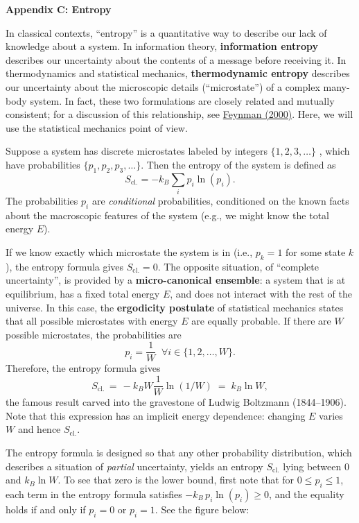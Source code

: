 \documentclass[pra,12pt]{revtex4}
\begin{document}
\begin{center}
{\large \textbf{Appendix C: Entropy}}
\end{center}

In classical contexts, ``entropy'' is a quantitative way to describe
our lack of knowledge about a system.  In information theory,
\textbf{information entropy} describes our uncertainty about the
contents of a message before receiving it.  In thermodynamics and
statistical mechanics, \textbf{thermodynamic entropy} describes our
uncertainty about the microscopic details (``microstate'') of a
complex many-body system.  In fact, these two formulations are closely
related and mutually consistent; for a discussion of this
relationship, see \hyperref[cite:feynman]{Feynman (2000)}.  Here, we
will use the statistical mechanics point of view.

Suppose a system has discrete microstates labeled by integers
$\{1,2,3,\dots\}$ , which have probabilities $\{p_1, p_2, p_3,
\dots\}$.  Then the entropy of the system is defined as
$$S_{\mathrm{cl.}} = - k_B \sum_{i} p_i \ln(p_i).$$
The probabilities $p_i$ are \textit{conditional} probabilities,
conditioned on the known facts about the macroscopic features of the
system (e.g., we might know the total energy $E$).

If we know exactly which microstate the system is in (i.e., $p_k = 1$
for some state $k$), the entropy formula gives $S _{\mathrm{cl.}} =
0$.  The opposite situation, of ``complete uncertainty'', is provided
by a \textbf{micro-canonical ensemble}: a system that is at
equilibrium, has a fixed total energy $E$, and does not interact with
the rest of the universe.  In this case, the \textbf{ergodicity
  postulate} of statistical mechanics states that all possible
microstates with energy $E$ are equally probable.  If there are $W$
possible microstates, the probabilities are
$$p_i = \frac{1}{W} \;\;\forall i \in \{1,2,\dots,W\}.$$
Therefore, the entropy formula gives
$$S_{\mathrm{cl.}} \,=\, -k_B W \frac{1}{W} \ln(1/W) \;=\; k_B \ln W,$$
the famous result carved into the gravestone of Ludwig Boltzmann
(1844--1906).  Note that this expression has an implicit energy
dependence: changing $E$ varies $W$ and hence $S_{\mathrm{cl.}}$.

The entropy formula is designed so that any other probability
distribution, which describes a situation of \textit{partial}
uncertainty, yields an entropy $S_{\mathrm{cl.}}$ lying between $0$
and $k_B \ln W$.  To see that zero is the lower bound, first note that
for $0 \le p_i \le 1$, each term in the entropy formula satisfies
$-k_B\, p_i\ln(p_i) \ge 0$, and the equality holds if and only if $p_i
= 0$ or $p_i = 1$.  See the figure below:
\end{document}
